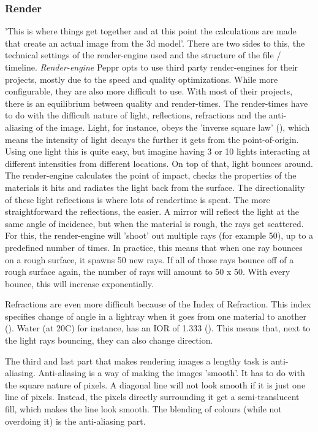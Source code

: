 \subsubsection{Render}
\label{sec:render}
'This is where things get together and at this point the calculations are made that create an actual image from the 3d model'. There are two sides to this, the technical settings of the render-engine used and the structure of the file / timeline.
\newline
\textit{Render-engine}
\newline
Peppr opts to use third party render-engines for their projects, mostly due to the speed and quality optimizations. While more configurable, they are also more difficult to use. With most of their projects, there is an equilibrium between quality and render-times. The render-times have to do with the difficult nature of light, reflections, refractions and the anti-aliasing of the image. Light, for instance, obeys the 'inverse square law' (\cite{inverseLightLaw}), which means the intensity of light decays the further it gets from the point-of-origin. Using one light this is quite easy, but imagine having 3 or 10 lights interacting at different intensities from different locations. On top of that, light bounces around. The render-engine calculates the point of impact, checks the properties of the materials it hits and radiates the light back from the surface. The directionality of these light reflections is where lots of rendertime is spent. The more straightforward the reflections, the easier. A mirror will reflect the light at the same angle of incidence, but when the material is rough, the rays get scattered. For this, the render-engine will 'shoot' out multiple rays (for example 50), up to a predefined number of times. In practice, this means that when one ray bounces on a rough surface, it spawns 50 new rays. If all of those rays bounce off of a rough surface again, the number of rays will amount to 50 x 50. With every bounce, this will increase exponentially.

Refractions are even more difficult because of the Index of Refraction. This index specifies change of angle in a lightray when it goes from one material to another (\cite{refractiveIndex}). Water (at 20\degree C) for instance, has an IOR of 1.333 (\cite{waterIOR}). This means that, next to the light rays bouncing, they can also change direction.

The third and last part that makes rendering images a lengthy task is anti-aliasing. Anti-aliasing is a way of making the images 'smooth'. It has to do with the square nature of pixels. A diagonal line will not look smooth if it is just one line of pixels. Instead, the pixels directly surrounding it get a semi-translucent fill, which makes the line look smooth. The blending of colours (while not overdoing it) is the anti-aliasing part.

